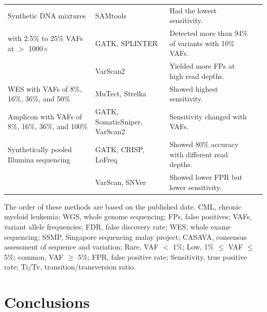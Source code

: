 \documentclass[a4,center,fleqn]{NAR}
\begin{document}
\begin{landscape}
\begin{table}[htbp]
\begin{threeparttable}
\begin{tabular}{rlrr}
    \midrule
    \multicolumn{1}{l}{Synthetic DNA mixtures } & SAMtools & \multicolumn{1}{l}{Had the lowest sensitivity.} &~\citep{Spencer2014}\\
    \multicolumn{1}{l}{with 2.5\% to 25\% VAFs at $>$ 1000$\times$ } & GATK,  SPLINTER & \multicolumn{1}{l}{Detected more than 94\% of variants with 10\% VAFs.} &  \\
          & VarScan2 & \multicolumn{1}{l}{Yielded more FPs at high read depths.} &  \\

    \midrule
    \multicolumn{1}{l}{WES with VAFs of 8\%, 16\%, 36\%, and 50\%} & MuTect, Strelka & \multicolumn{1}{l}{Showed highest sensitivity.} &~\citep{Xu2014}\\
    \multicolumn{1}{l}{Amplicon with VAFs of 8\%, 16\%, 36\%, and 100\%} & GATK, SomaticSniper, VarScan2 & \multicolumn{1}{l}{Sensitivity changed with VAFs.} &  \\

    \midrule
    \multicolumn{1}{l}{Synthetically pooled Illumina sequencing} & GATK, CRISP, LoFreq & \multicolumn{1}{l}{Showed 80\% accuracy with different read depths.} &~\citep{Huang2015} \\
          & VarScan, SNVer  & \multicolumn{1}{l}{Showed lower FPR but lower sensitivity.} &  \\

    \bottomrule
    \end{tabular}
   \begin{tablenotes}
	\item The order of these methods are based on the published date.
CML, chronic myeloid leukemia;
WGS, whole genome sequencing;
FPs, false positives;
VAFs, variant allele frequencies;
FDR, false discovery rate;
WES, whole exame sequencing;
SSMP, Singapore sequencing malay project;
CASAVA, consensus assessment of sequence and variation;
Rare, VAF $<$ 1\%; Low, 1\% $\leqslant$ VAF $\leqslant$  5\%; common, VAF $\geqslant$ 5\%;
FPR, false positive rate;
Sensitivity, true positive rate;
Ti/Tv, transition/transversion ratio.
    \end{tablenotes}
\end{threeparttable}
\end{table}
\end{landscape}




\section{Conclusions}
\end{document}
